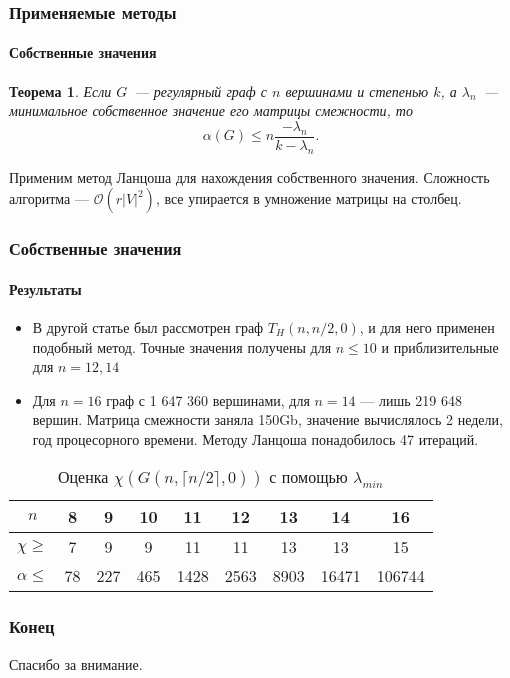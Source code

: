 \documentclass[svgnames,table]{beamer}
\newtheorem{proposition}{Теорема}
\begin{document}
\begin{frame}
    \frametitle{Применяемые методы}
    \framesubtitle{Собственные значения}
    \begin{proposition}
        Если $G$~--- регулярный граф с $n$ вершинами
        и степенью $k$, а $\lambda_n$~--- минимальное собственное значение
        его матрицы смежности, то
        \begin{equation}
            \alpha(G) \leq n\frac{-\lambda_n}{k-\lambda_n}.
        \end{equation}
    \end{proposition}
    Применим метод Ланцоша для нахождения собственного значения.
    Сложность алгоритма --- $\mathcal O(r|V|^2)$, все упирается в умножение
    матрицы на столбец.
\end{frame}

\begin{frame}
    \frametitle{Собственные значения}
    \framesubtitle{Результаты}
    \begin{itemize}
        \item В другой статье был рассмотрен граф $T_H(n,n/2,0)$, и для него
            применен подобный метод. Точные значения получены для $ n \leq 10$
            и приблизительные для $n=12,14$
        \item Для $n=16$ граф с 1 647 360 вершинами,
           для $n=14$ --- лишь 219 648 вершин.  Матрица смежности заняла 150Gb,
           значение вычислялось 2 недели, год процесорного времени. Методу Ланцоша понадобилось 47 итераций.
    \end{itemize}
    \begin{table}[h]
        \centering
        \caption{Оценка $\chi(G(n,\lceil n/2\rceil,0))$ с помощью $\lambda_{min}$}
    \begin{tabular}{|c|c|c|c|c|c|c|c|c|}
    \hline
    $n$ &           8  & 9   & 10 & 11   & 12  & 13 & 14 & 16 \\ \hline
    $\chi \geq$   & 7  & 9   &  9 & 11   & 11  & 13 & 13 & 15 \\ \hline
    $\alpha \leq$ & 78 & 227 &465 & 1428 &2563 & 8903 & 16471 & 106744 \\ \hline
    \end{tabular}
    \end{table}

\end{frame}

\begin{frame}
    \frametitle{Конец}
    \begin{center}
    Спасибо за внимание.
    \end{center}

\end{frame}
\end{document}
